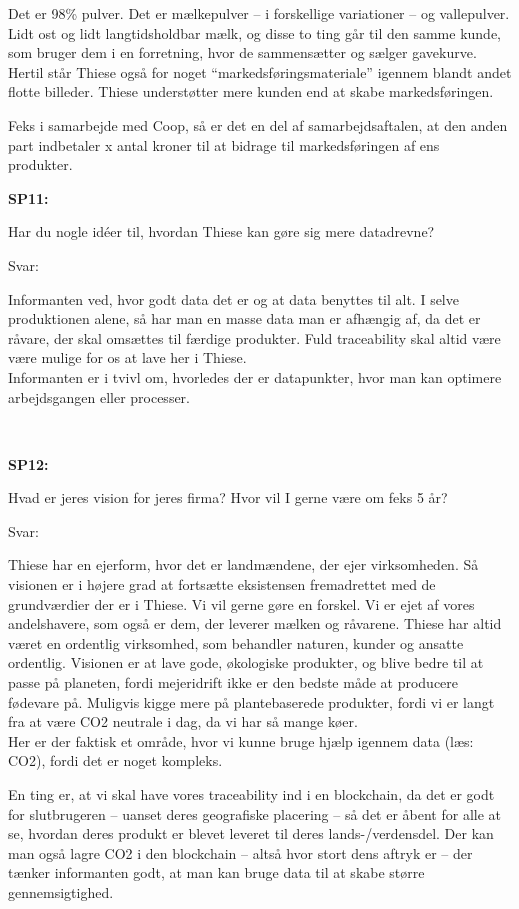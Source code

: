 \documentclass[
  12pt,
  a4paper,
  DIV=11,
  numbers=noendperiod]{scrartcl}
\begin{document}
\begin{itemize}
  Det er 98\% pulver. Det er mælkepulver -- i forskellige variationer --
  og vallepulver. Lidt ost og lidt langtidsholdbar mælk, og disse to
  ting går til den samme kunde, som bruger dem i en forretning, hvor de
  sammensætter og sælger gavekurve. Hertil står Thiese også for noget
  ``markedsføringsmateriale'' igennem blandt andet flotte billeder.
  Thiese understøtter mere kunden end at skabe markedsføringen.~~

  Feks i samarbejde med Coop, så er det en del af samarbejdsaftalen, at
  den anden part indbetaler x antal kroner til at bidrage til
  markedsføringen af ens produkter.~~

  \textbf{SP11:}~

  Har du nogle idéer til, hvordan Thiese kan gøre sig mere datadrevne?~

  Svar:~

  Informanten ved, hvor godt data det er og at data benyttes til alt. I
  selve produktionen alene, så har man en masse data man er afhængig af,
  da det er råvare, der skal omsættes til færdige produkter. Fuld
  traceability skal altid være være mulige for os at lave her i Thiese.
  ~\\
  Informanten er i tvivl om, hvorledes der er datapunkter, hvor man kan
  optimere arbejdsgangen eller processer.~~

  ~

  \textbf{SP12:}~

  Hvad er jeres vision for jeres firma? Hvor vil I gerne være om feks 5
  år?~

  Svar:~

  Thiese har en ejerform, hvor det er landmændene, der ejer
  virksomheden. Så visionen er i højere grad at fortsætte eksistensen
  fremadrettet med de grundværdier der er i Thiese. Vi vil gerne gøre en
  forskel. Vi er ejet af vores andelshavere, som også er dem, der
  leverer mælken og råvarene. Thiese har altid været en ordentlig
  virksomhed, som behandler naturen, kunder og ansatte ordentlig.
  Visionen er at lave gode, økologiske produkter, og blive bedre til at
  passe på planeten, fordi mejeridrift ikke er den bedste måde at
  producere fødevare på. Muligvis kigge mere på plantebaserede
  produkter, fordi vi er langt fra at være CO2 neutrale i dag, da vi har
  så mange køer. ~\\
  Her er der faktisk et område, hvor vi kunne bruge hjælp igennem data
  (læs: CO2), fordi det er noget kompleks.~~

  En ting er, at vi skal have vores traceability ind i en blockchain, da
  det er godt for slutbrugeren -- uanset deres geografiske placering --
  så det er åbent for alle at se, hvordan deres produkt er blevet
  leveret til deres lands-/verdensdel. Der kan man også lagre CO2 i den
  blockchain -- altså hvor stort dens aftryk er -- der tænker
  informanten godt, at man kan bruge data til at skabe større
  gennemsigtighed.~~


\end{itemize}
\end{document}
